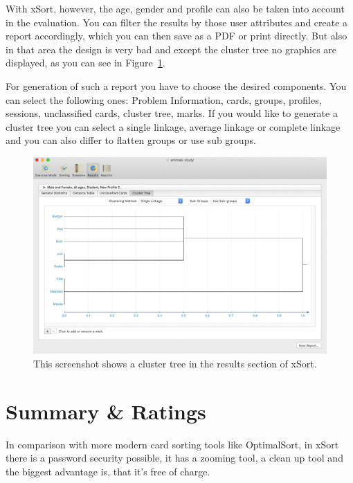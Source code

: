 With xSort, however, the age, gender and profile can also 
be taken into account in the evaluation. You can filter the 
results by those user attributes and create a report accordingly, 
which you can then save as a PDF or print directly. But also 
in that area the design is very bad and except the cluster 
tree no graphics are displayed, as you can see in
Figure~\ref{fig:xSort-cluster}.

For generation of such a report you have to choose the 
desired components. You can select the following ones: 
Problem Information, cards, groups, profiles, sessions, 
unclassified cards, cluster tree, marks. If you would like 
to generate a cluster tree you can select a single linkage, 
average linkage or complete linkage and you can also 
differ to flatten groups or use sub groups.



\begin{figure}[tp] 
\centering
\includegraphics[keepaspectratio,width=460px]{images/xsort-analysis.png}
\caption[xSort Analysis] { This screenshot shows a cluster tree in the results section of xSort.
 }
\label{fig:xSort-cluster}
\end{figure}



\section{Summary \& Ratings}

In comparison with more modern card sorting tools like 
OptimalSort, in xSort there is a password security possible, 
it has a zooming tool, a clean up tool and the biggest advantage 
is, that it’s free of charge.

